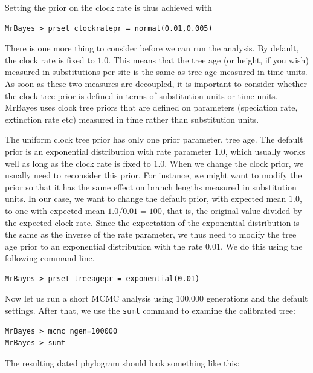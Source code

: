 \documentclass[12pt]{book}
\newcommand{\ttt}[1]{\texttt{#1} }
\begin{document}
Setting the prior on the clock rate is thus achieved with

\begin{verbatim}
MrBayes > prset clockratepr = normal(0.01,0.005)
\end{verbatim}

There is one more thing to consider before we can run the analysis. By default, the clock rate is fixed to $1.0$.
This means that the tree age (or height, if you wish) measured in substitutions per site is the same as tree age
measured in time units. As soon as these two measures are decoupled, it is important to consider whether
the clock tree prior is defined in terms of substitution units or time units. MrBayes uses clock tree priors that
are defined on parameters (speciation rate, extinction rate etc) measured in time rather than substitution
units.

The uniform clock tree prior has only one prior parameter, tree age. The default prior is an exponential
distribution with rate parameter $1.0$, which usually works well as long as the clock rate is fixed to $1.0$.
When we change the clock prior, we usually need to reconsider this prior. For instance, we might want to
modify the prior so that it has the same effect on branch lengths measured in substitution units. In our case,
we want to change the default prior, with expected mean $1.0$, to one with expected mean $1.0 / 0.01 = 100$,
that is, the original value divided by the expected clock rate. Since the expectation of the exponential distribution
is the same as the inverse of the rate parameter, we thus need to modify the tree age prior to an exponential
distribution with the rate $0.01$. We do this using the following command line.

\begin{verbatim}
MrBayes > prset treeagepr = exponential(0.01)
\end{verbatim}

Now let us run a short MCMC analysis using 100,000 generations and the default settings. After that, we use
the \ttt{sumt} command to examine the calibrated tree:

\begin{singlespacing}
\begin{verbatim}
MrBayes > mcmc ngen=100000
MrBayes > sumt
\end{verbatim}
\end{singlespacing}

The resulting dated phylogram should look something like this:
\end{document}
